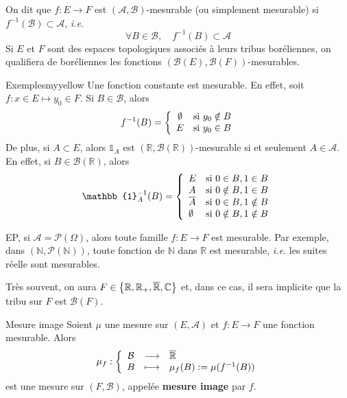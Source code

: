     \begin{defi}{}{}
        On dit que $f : E \to F$ est $(\mathcal{A}, \mathcal{B})$-mesurable (ou simplement mesurable) si $f^{-1}(\mathcal{B}) \subset \mathcal{A}$, \textit{i.e.} 
        \[ \forall B \in \mathcal{B}, \quad f^{-1}(B) \subset \mathcal{A} \]
        Si $E$ et $F$ sont des espaces topologiques associés à leurs tribus boréliennes, on qualifiera de boréliennes les fonctions $\left(\mathcal{B}(E), \mathcal{B}(F)\right)$-mesurables.
    \end{defi}

    \begin{omed}{Exemples}{myyellow}
        Une fonction constante est mesurable. En effet, soit $f : x \in E \mapsto y_0 \in F$. Si $B \in \mathcal{B}$, alors 
        \[ f^{-1}(B) = \sisi{\emptyset}{y_0 \notin B}{E}{y_0 \in B} \]  
        De plus, si $A \subset E$, alors $\mathbb{1}_A$ est $(\mathbb{R}, \mathcal{B}(\mathbb{R}))$-mesurable si et seulement $A \in \mathcal{A}$. En effet, si $B \in \mathcal{B}(\mathbb{R})$, alors 
        \[ \mathbb{1}_A^{-1}(B) = \left\{ \begin{array}{ll}
            E & \text{si } 0 \in B, 1 \in B \\
            A & \text{si } 0 \notin B, 1 \in B \\
            \ovl{A} & \text{si } 0 \in B, 1 \notin B \\
            \emptyset & \text{si } 0 \notin B, 1 \notin B
        \end{array} \right. \]   
    \end{omed}

    EP, si $\mathcal{A} = \mathcal{P}(\Omega)$, alors toute famille $f : E \to F$ est mesurable. Par exemple, dans $(\mathbb{N}, \mathcal{P}(\mathbb{N}))$, toute fonction de $\mathbb{N}$ dans $\mathbb{R}$ est mesurable, \textit{i.e.} les suites réelle sont mesurables. 

    Très souvent, on aura $F \in \left\{\mathbb{R}, \mathbb{R}_+, \overline{\mathbb{R}}, \mathbb{C}\right\}$ et, dans ce cas, il sera implicite que la tribu sur $F$ est $\mathcal{B}(F)$.

    \begin{defi}{Mesure image}
        Soient $\mu$ une mesure sur $(E,\mathcal{A})$ et $f : E \to F$ une fonction mesurable. Alors 
        \[ \fonction{\mu_f}{\mathcal{B}}{\ovl{\mathbb{R}}}{B}{\mu_f(B) := \mu(f^{-1}(B))} \]  
        est une mesure sur $(F,\mathcal{B})$, appelée \textbf{mesure image} par $f$.
    \end{defi}

